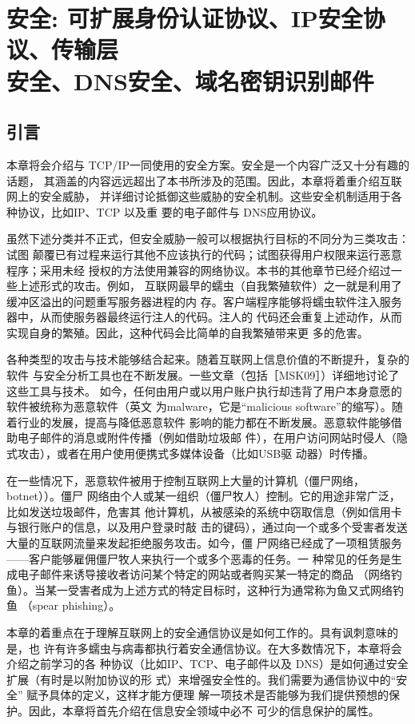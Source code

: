 \chapter[安全]{安全: 可扩展身份认证协议、IP安全协议、传输层\\ 
安全、DNS安全、域名密钥识别邮件}
\section{引言}
本章将会介绍与 TCP/IP一同使用的安全方案。安全是一个内容广泛又十分有趣的话题，
其涵盖的内容远远超出了本书所涉及的范围。因此，本章将着重介绍互联网上的安全威胁，
并详细讨论抵御这些威胁的安全机制。这些安全机制适用于各种协议，比如IP、TCP 以及重
要的电子邮件与 DNS应用协议。

虽然下述分类并不正式，但安全威胁一般可以根据执行目标的不同分为三类攻击：试图
颠覆已有过程来运行其他不应该执行的代码；试图获得用户权限来运行恶意程序；采用未经
授权的方法使用兼容的网络协议。本书的其他章节已经介绍过一些上述形式的攻击。例如，
互联网最早的蠕虫（自我繁殖软件）之一就是利用了缓冲区溢出的问题重写服务器进程的内
存。客户端程序能够将蠕虫软件注入服务器中，从而使服务器最终运行注人的代码。注人的
代码还会重复上述动作，从而实现自身的繁殖。因此，这种代码会比简单的自我繁殖带来更
多的危害。

各种类型的攻击与技术能够结合起来。随着互联网上信息价值的不断提升，复杂的软件
与安全分析工具也在不断发展。一些文章（包括［MSK09］）详细地讨论了这些工具与技术。
如今，任何由用户或以用户账户执行却违背了用户本身意愿的软件被统称为恶意软件（英文
为malware，它是“malicious software”的缩写）。随着行业的发展，提高与降低恶意软件
影响的能力都在不断发展。恶意软件能够借助电子邮件的消息或附件传播（例如借助垃圾邮
件），在用户访问网站时侵人（隐式攻击），或者在用户使用便携式多媒体设备（比如USB驱
动器）时传播。

在一些情况下，恶意软件被用于控制互联网上大量的计算机（僵尸网络，botnet））。僵尸
网络由个人或某一组织（僵尸牧人）控制。它的用途非常广泛，比如发送垃圾邮件，危害其
他计算机，从被感染的系统中窃取信息（例如信用卡与银行账户的信息，以及用户登录时敲
击的键码），通过向一个或多个受害者发送大量的互联网流量来发起拒绝服务攻击。如今，僵
尸网络已经成了一项租赁服务——客户能够雇佣僵尸牧人来执行一个或多个恶毒的任务。一
种常见的任务是生成电子邮件来诱导接收者访问某个特定的网站或者购买某一特定的商品
（网络钓鱼）。当某一受害者成为上述方式的特定目标时，这种行为通常称为鱼又式网络钓鱼
（spear phishing）。

本章的着重点在于理解互联网上的安全通信协议是如何工作的。具有讽刺意味的是，也
许有许多蠕虫与病毒都执行着安全通信协议。在大多数情况下，本章将会介绍之前学习的各
种协议（比如IP、TCP、电子邮件以及 DNS）是如何通过安全扩展（有时是以附加协议的形
式）来增强安全性的。我们需要为通信协议中的“安全” 赋予具体的定义，这样才能方便理
解一项技术是否能够为我们提供预想的保护。因此，本章将首先介绍在信息安全领域中必不
可少的信息保护的属性。

